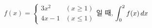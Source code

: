 $f(x)=\begin{cases} 3x^2 & (x\ge 1) \\ 4x-1 & (x\le 1) \end{cases}$일 때, $\displaystyle\int_{0}^{2} f(x)\mkern3mu dx$
